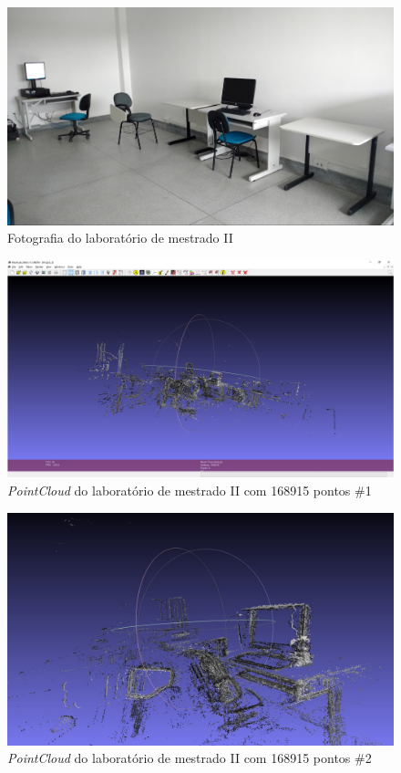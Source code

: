 \begin{figure}[H]
	\centering
		\includegraphics[width= \textwidth]{Imagens/figura4-15.jpg}
	\caption{Fotografia do laboratório de mestrado II}
	\label{fig4:15}
\end{figure}

\begin{figure}[H]
	\centering
		\includegraphics[width= \textwidth]{Imagens/figura4-13.jpg}
	\caption{\textit{PointCloud} do laboratório de mestrado II com 168915 pontos \#1}
	\label{fig4:13}
\end{figure}

\begin{figure}[H]
	\centering
		\includegraphics[width= \textwidth]{Imagens/figura4-14.jpg}
	\caption{\textit{PointCloud} do laboratório de mestrado II com 168915 pontos \#2}
	\label{fig4:14}
\end{figure}

